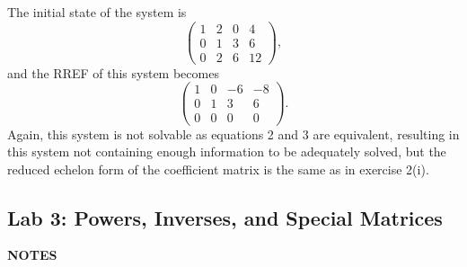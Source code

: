 \documentclass[12pt]{article}
\newcommand{\notes}{\textbf{NOTES}}
\begin{document}
The initial state of the system is
\begin{equation*}
\begin{pmatrix}
1 & 2 & 0 & 4 \\
0 & 1 & 3 & 6 \\
0 & 2 & 6 & 12
\end{pmatrix},
\end{equation*}
and the RREF of this system becomes
\begin{equation*}
\begin{pmatrix}
1 & 0 & -6 & -8 \\
0 & 1 & 3 & 6 \\
0 & 0 & 0 & 0
\end{pmatrix}.
\end{equation*}
Again, this system is not solvable as equations 2 and 3 are equivalent, resulting in this system not containing enough information to be adequately solved, but the reduced echelon form of the coefficient matrix is the same as in exercise 2(i).

\subsection{Lab 3: Powers, Inverses, and Special Matrices}

\notes
\end{document}
